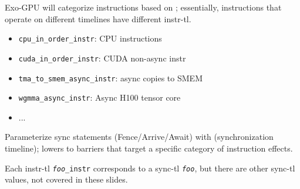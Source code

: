 \begin{minipage}[t]{0.48\textwidth}\fixminipage
{}

Exo-GPU will categorize instructions based on ; essentially, instructions that operate on different timelines have different instr-tl.
\begin{itemize}
  \item \texttt{cpu\_in\_order\_instr}: CPU instructions
  \item \texttt{cuda\_in\_order\_instr}: CUDA non-async instr
  \item \texttt{tma\_to\_smem\_async\_instr}: async copies to SMEM
  \item \texttt{wgmma\_async\_instr}: Async H100 tensor core
  \item ...
\end{itemize}


Parameterize sync statements (Fence/Arrive/Await) with  (synchronization timeline); lowers to barriers that target a specific category of instruction effects.

Each instr-tl \texttt{\textit{foo}\_instr} corresponds to a sync-tl \texttt{\textit{foo}}, but there are other sync-tl values, not covered in these slides.

\end{minipage}

\newpage
{}



\newpage
{}



\newpage
{}



\newpage
{}



\newpage
{}



\newpage
{}



\newpage
{}



\newpage
{}



\newpage
{}



\newpage
{}





